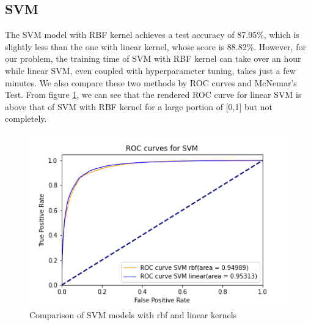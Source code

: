 \documentclass[10pt,twocolumn,letterpage]{article}
\begin{document}
	\subsection{SVM}
		The SVM model with RBF kernel achieves a test accuracy of 87.95\%, which is slightly less than the one with linear kernel, whose score is 88.82\%. However, for our problem, the training time of SVM with RBF kernel can take over an hour while linear SVM, even coupled with hyperparameter tuning, takes just a few minutes. We also compare these two methods by ROC curves and McNemar's Test. From figure \ref{ROC_SVM}, we can see that the rendered ROC curve for linear SVM is above that of SVM with RBF kernel for a large portion of [0,1] but not completely.  
		\begin{figure}[htbp]
			\includegraphics[width=\columnwidth]{ROC_SVM}
			\caption{Comparison of SVM models with rbf and linear kernels}\label{ROC_SVM}
		\end{figure} 
	
\end{document}
